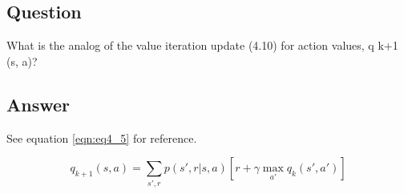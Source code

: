\documentclass[11pt]{article}
\begin{document}
    \subsection{Question}

    What is the analog of the value iteration update (4.10) for action values, q k+1 (s, a)?

    \subsection*{Answer}

    See equation \ref{eqn:eq4_5} for reference.

    \begin{equation}
        q_{k+1}(s, a) = \sum_{s',r} p(s', r | s, a) [r + \gamma \max_{a'} q_k(s', a')]
    \end{equation}
\end{document}
